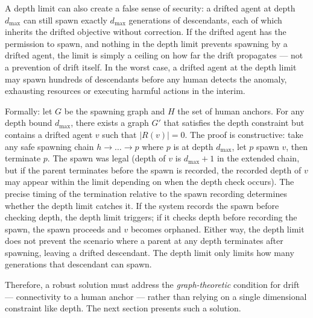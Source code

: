 A depth limit can also create a false sense of security: a drifted agent at depth $d_{\max}$ can still spawn exactly $d_{\max}$ generations of descendants, each of which inherits the drifted objective without correction. If the drifted agent has the permission to spawn, and nothing in the depth limit prevents spawning by a drifted agent, the limit is simply a ceiling on how far the drift propagates — not a prevention of drift itself. In the worst case, a drifted agent at the depth limit may spawn hundreds of descendants before any human detects the anomaly, exhausting resources or executing harmful actions in the interim.

Formally: let $G$ be the spawning graph and $H$ the set of human anchors. For any depth bound $d_{\max}$, there exists a graph $G'$ that satisfies the depth constraint but contains a drifted agent $v$ such that $|R(v)| = 0$. The proof is constructive: take any safe spawning chain $h \to \dots \to p$ where $p$ is at depth $d_{\max}$, let $p$ spawn $v$, then terminate $p$. The spawn was legal (depth of $v$ is $d_{\max} + 1$ in the extended chain, but if the parent terminates before the spawn is recorded, the recorded depth of $v$ may appear within the limit depending on when the depth check occurs). The precise timing of the termination relative to the spawn recording determines whether the depth limit catches it. If the system records the spawn before checking depth, the depth limit triggers; if it checks depth before recording the spawn, the spawn proceeds and $v$ becomes orphaned. Either way, the depth limit does not prevent the scenario where a parent at any depth terminates after spawning, leaving a drifted descendant. The depth limit only limits how many generations that descendant can spawn.

Therefore, a robust solution must address the \emph{graph-theoretic} condition for drift — connectivity to a human anchor — rather than relying on a single dimensional constraint like depth. The next section presents such a solution.